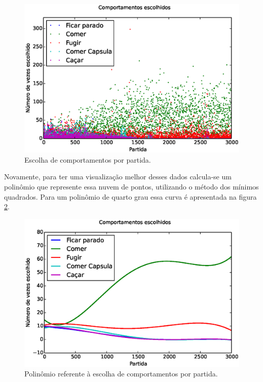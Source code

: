 \begin{figure}[h]
    \centering
    \includegraphics[width=\linewidth]{images/5_behaviors_small_map/chosen_behaviors}
    \caption{Escolha de comportamentos por partida.}
    \label{img:5ComportamentosMapaPequeno:ComportamentosEscolhidos}
\end{figure}

Novamente, para ter uma visualização melhor desses dados calcula-se um polinômio que represente essa nuvem de pontos, utilizando o método dos mínimos quadrados. Para um polinômio de quarto grau essa curva é apresentada na figura \ref{img:5ComportamentosMapaPequeno:ComportamentosEscolhidosPolinômio}.

\begin{figure}[H]
    \centering
    \includegraphics[width=\linewidth]{images/5_behaviors_small_map/chosen_behaviors_pol}
    \caption{Polinômio referente à escolha de comportamentos por partida.}
    \label{img:5ComportamentosMapaPequeno:ComportamentosEscolhidosPolinômio}
\end{figure}

